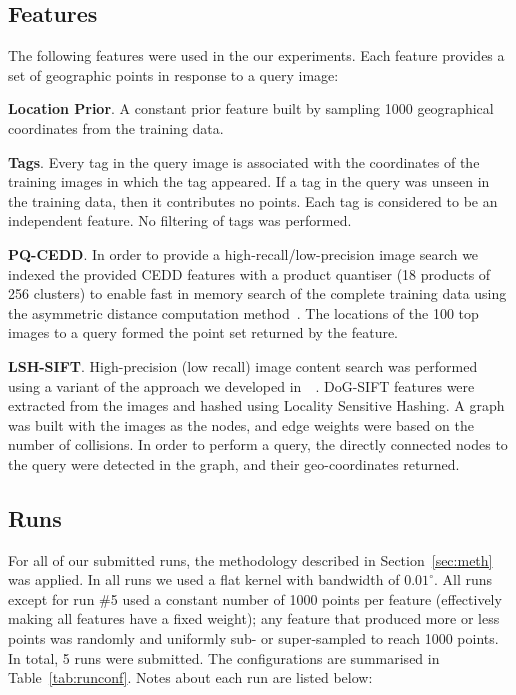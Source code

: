 \documentclass{../acm_proc_article-me11_tweaked}
\begin{document}
\subsection{Features}
The following features were used in the our experiments. Each feature provides a set of geographic points in response to a query image:

\noindent\textbf{Location Prior}. A constant prior feature built by sampling 1000 geographical coordinates from the training data.

\noindent\textbf{Tags}. Every tag in the query image is associated with the coordinates of the training images in which the tag appeared. If a tag in the query was unseen in the training data, then it contributes no points. Each tag is considered to be an independent feature. No filtering of tags was performed.

\noindent\textbf{PQ-CEDD}. In order to provide a high-recall/low-precision image search we indexed the provided CEDD features with a product quantiser (18 products of 256 clusters) to enable fast in memory search of the complete training data using the asymmetric distance computation method~\cite{Jegou:2011:PQN:1916487.1916695}. The locations of the 100 top images to a query formed the point set returned by the feature.

\noindent\textbf{LSH-SIFT}. High-precision (low recall) image content search was performed using a variant of the approach we developed in~~\cite{Hare:2013:TVP:2461466.2461514}. DoG-SIFT features were extracted from the images and hashed using Locality Sensitive Hashing. A graph was built with the images as the nodes, and edge weights were based on the number of collisions. In order to perform a query, the directly connected nodes to the query were detected in the graph, and their geo-coordinates returned.

\subsection{Runs}
For all of our submitted runs, the methodology described in Section~\ref{sec:meth} was applied. In all runs we used a flat kernel with bandwidth of $0.01^\circ$. All runs except for run \#5 used a constant number of 1000 points per feature (effectively making all features have a fixed weight); any feature that produced more or less points was randomly and uniformly sub- or super-sampled to reach 1000 points. In total, 5 runs were submitted. The configurations are summarised in Table~\ref{tab:runconf}. Notes about each run are listed below:
\end{document}
